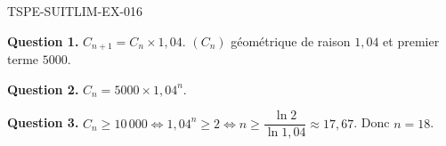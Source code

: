 \begin{corrige}{TSPE-SUITLIM-EX-016}

\textbf{Question 1.} $C_{n+1} = C_n \times 1{,}04$. $(C_n)$ géométrique de raison $1{,}04$ et premier terme $5000$.

\textbf{Question 2.} $C_n = 5000 \times 1{,}04^n$.

\textbf{Question 3.} $C_n \geq 10\,000 \iff 1{,}04^n \geq 2 \iff n \geq \dfrac{\ln 2}{\ln 1{,}04} \approx 17{,}67$. Donc $\boxed{n = 18}$.

\end{corrige}
